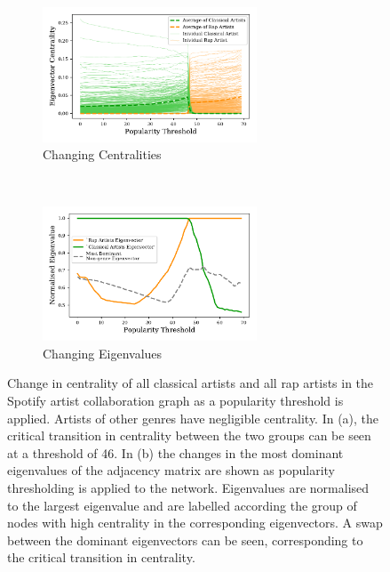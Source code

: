 \begin{figure}[!htbp]
	\centering
	\begin{subfigure}[t]{\textwidth}
		\centering
		\includegraphics[width=0.7\textwidth]{chapter4/figs/spotify_a.pdf}
		\caption{Changing Centralities}
		\label{fig:rank_spotify_shift_a}
	\end{subfigure}
	~
	\begin{subfigure}[t]{\textwidth}
		\centering
		\includegraphics[width=0.7\textwidth]{chapter4/figs/spotify_b.pdf}
		\caption{Changing Eigenvalues}
		\label{fig:rank_spotify_shift_b}
	\end{subfigure}
	\caption{Change in centrality of all classical artists and all rap artists in the Spotify artist collaboration graph as a popularity threshold is applied. Artists of other genres have negligible centrality. In (a), the critical transition in centrality between the two groups can be seen at a threshold of 46. In (b) the changes in the most dominant eigenvalues of the adjacency matrix are shown as popularity thresholding is applied to the network. Eigenvalues are normalised to the largest eigenvalue and are labelled according the group of nodes with high centrality in the corresponding eigenvectors. A swap between the dominant eigenvectors can be seen, corresponding to the critical transition in centrality.}
\end{figure}

